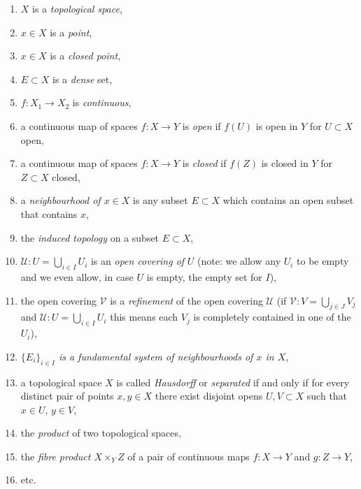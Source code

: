 \begin{enumerate}
\item
\label{item-space}
$X$ is a {\it topological space},
\item
\label{item-point}
$x\in X$ is a {\it point},
\item
\label{item-closed-point}
$x\in X$ is a {\it closed point},
\item
\label{item-dense}
$E \subset X$ is a {\it dense} set,
\item
\label{item-continuous}
$f : X_1 \to X_2$ is {\it continuous},
\item a continuous map of spaces $f : X \to Y$ is
{\it open} if $f(U)$ is open in $Y$ for $U \subset X$ open,
\item a continuous map of spaces $f : X \to Y$ is
{\it closed} if $f(Z)$ is closed in $Y$ for $Z \subset X$ closed,
\item
\label{item-neighbourhood}
a {\it neighbourhood of $x \in X$} is any subset
$E \subset X$ which contains an open subset that
contains $x$,
\item
\label{item-induced-toplogy}
the {\it induced topology} on a subset $E \subset X$,
\item
\label{item-covering}
$\mathcal{U} : U = \bigcup_{i \in I} U_i$ is an
{\it open covering of} $U$ (note: we allow any $U_i$ to be empty
and we even allow, in case $U$ is empty, the empty set for $I$),
\item
\label{item-refinement}
the open covering $\mathcal{V}$ is a {\it refinement}
of the open covering $\mathcal{U}$ (if
$\mathcal{V} : V = \bigcup_{j \in J} V_j$ and
$\mathcal{U} : U = \bigcup_{i \in I} U_i$
this means each $V_j$ is completely contained in one of the $U_i$),
\item
\label{item-fundamental-system}
{\it $\{ E_i \}_{i \in I}$ is a fundamental system of neighbourhoods
of $x$ in $X$},
\item
\label{item-Hausdorff}
a topological space $X$ is called {\it Hausdorff} or {\it separated}
if and only if for every distinct pair of points $x, y \in X$ there exist
disjoint opens $U, V \subset X$ such that $x \in U$, $y \in V$,
\item the {\it product} of two topological spaces,
\label{item-product}
\item
\label{item-fibre-product}
the {\it fibre product $X \times_Y Z$} of a pair of continuous maps
$f : X \to Y$ and $g : Z \to Y$,
\item etc.
\end{enumerate}



